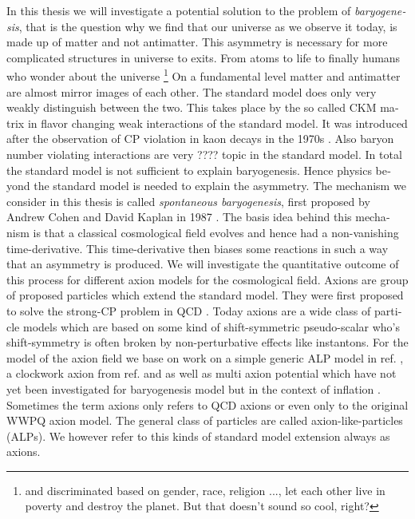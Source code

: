 \documentclass[master,       %
               twoside,        %
               BCOR10mm,       %
               english,ngerman, %
               ]{GAUBM}
\begin{document}
\begin{otherlanguage}{english}
In this thesis we will investigate a potential solution to the problem of \emph{baryogenesis}, that is
the question why we find that our universe as we observe it today, is made up of matter and not antimatter.
This asymmetry is necessary for more complicated structures in universe to exits. From atoms to life to finally humans who wonder about the universe \footnote{and discriminated based on gender, race, religion ..., let each other live in poverty and destroy the planet. But that doesn't sound so cool, right?}
On a fundamental level matter and antimatter are almost mirror images of each other. The standard model does only very weakly distinguish between the two. This takes place by the so called CKM matrix in flavor changing weak interactions of the standard model. It was introduced after the observation of CP violation in kaon decays in the 1970s \cite{cabibbo_PhysRevLett.10.531} \cite{Kobayashi_Maskawa_10.1143/PTP.49.652}. Also baryon number violating interactions are very ???? topic in the standard model. In total the standard model is not sufficient to explain baryogenesis.
Hence physics beyond the standard model is needed to explain the asymmetry.
The mechanism we consider in this thesis is called \emph{spontaneous baryogenesis}, first proposed by Andrew Cohen and David Kaplan in 1987 \cite{COHEN1987251} \cite{COHEN1988913}.
The basis idea behind this mechanism is that a classical cosmological field evolves and hence had a non-vanishing time-derivative.
This time-derivative then biases some reactions in such a way that an asymmetry is produced.
We will investigate the quantitative outcome of this process for different axion models for the cosmological field.
Axions are group of proposed particles which extend the standard model.
They were first proposed to solve the strong-CP problem in QCD \cite{PQ1} \cite{PQ2} \cite{Weinberg:1977ma} \cite{Wilczek:1977pj}. Today axions are a wide class of particle models which are based on some kind of shift-symmetric pseudo-scalar who's shift-symmetry is often broken by non-perturbative effects like instantons.
For the model of the axion field we base on work on a simple generic ALP model in ref. \cite{Kusenko_2015_Axion_Leptogenesis}, a clockwork axion from ref. \cite{Deformed_potential_Bae_2019} and \cite{general_cont_clockwork_Choi_2018} as well as multi axion potential which have not yet been investigated for baryogenesis model but in the context of inflation \cite{Kim_multi_axions:2004rp}.
Sometimes the term axions only refers to QCD axions or even only to the original WWPQ axion model. The general class of particles are called axion-like-particles (ALPs). We however refer to this kinds of standard model extension always as axions.

\end{otherlanguage}
\end{document}
